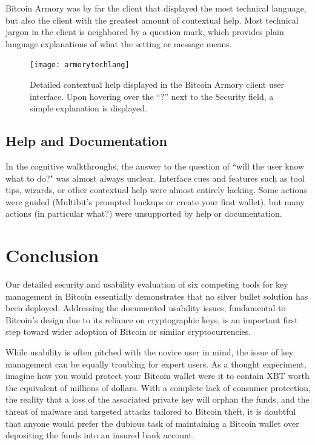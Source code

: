 
Bitcoin Armory was by far the client that displayed the most technical language, but also the client with the greatest amount of contextual help. Most technical jargon in the client is neighbored by a question mark, which provides plain language explanations of what the setting or message means. 

\begin{figure}[pt]
  \centering
  \texttt{[image: armorytechlang]}
  \caption{Detailed contextual help displayed in the Bitcoin Armory client user interface. Upon hovering over the ``?'' next to the Security field, a simple explanation is displayed.}
  \label{fig:armorytechlang}
\end{figure}

\subsection{Help and Documentation}

In the cognitive walkthroughs, the answer to the question of ``will the user know what to do?" was almost always unclear. Interface cues and features such as tool tips, wizards, or other contextual help were almost entirely lacking. Some actions were guided (\eg Multibit's prompted backups or create your first wallet), but many actions (in particular what?) were unsupported by help or documentation.  



\section{Conclusion}
Our detailed security and usability evaluation of six competing tools for key management in Bitcoin essentially demonstrates that no silver bullet solution has been deployed. Addressing the documented usability issues, fundamental to Bitcoin's design due to its reliance on cryptographic keys, is an important first step toward wider adoption of Bitcoin or similar cryptocurrencies. 

While usability is often pitched with the novice user in mind, the issue of key management can be equally troubling for expert users. As a thought experiment, imagine how you would protect your Bitcoin wallet were it to contain XBT worth the equivalent of millions of dollars. With a complete lack of consumer protection, the reality that a loss of the associated private key will orphan the funds, and the threat of malware and targeted attacks tailored to Bitcoin theft, it is doubtful that anyone would prefer the dubious task of maintaining a Bitcoin wallet over depositing the funds into an insured bank account. 

